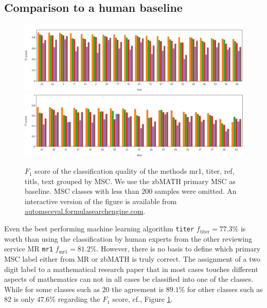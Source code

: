 \subsection{Comparison to a human baseline}
\begin{figure}[ht]
  \centering
  \includegraphics[width=1.1\textwidth]{overview1.png}
  \includegraphics[width=1.1\textwidth]{overview2.png}
  \caption{$F_1$ score of the classification quality of the methods mr1, titer, ref, titls, text grouped by MSC. We use the zbMATH primary MSC as baseline. MSC classes with less than 200 samples were omitted. An interactive version of the figure is available from \url{automsceval.formulasearchengine.com}.}\label{fgHum}
\end{figure}
Even the best performing machine learning algorithm \texttt{titer} $f_\mathrm{titer}=77.3\%$ is worth than using the classification by human experts from the other reviewing service MR \texttt{mr1} $f_\mathrm{mr1}=81.2\%.$ 
However, there is no basis to define which primary MSC label either from MR or zbMATH is truly correct.
The assignment of a two digit label to a mathematical research paper that in most cases touches different aspects of mathematics can not in all cases be classified into one of the classes.
While for some classes such as 20 the agreement is $89.1\%$ for other classes such as 82 is only $47.6\%$ regarding the $F_1$ score, cf., Figure \ref{fgHum}.

